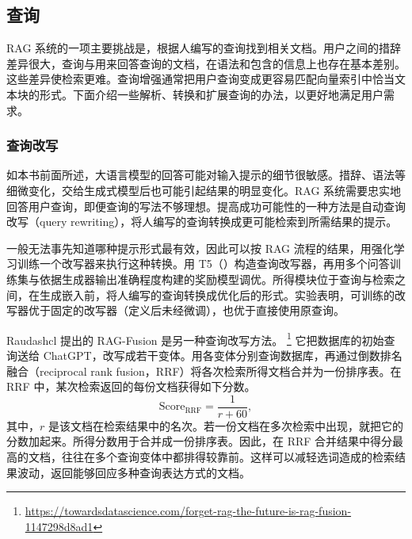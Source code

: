\subsection{查询}
\begin{keypoint}
RAG 系统的一项主要挑战是，根据人编写的查询找到相关文档。用户之间的措辞差异很大，查询与用来回答查询的文档，在语法和包含的信息上也存在基本差别。这些差异使检索更难。查询增强通常把用户查询变成更容易匹配向量索引中恰当文本块的形式。下面介绍一些解析、转换和扩展查询的办法，以更好地满足用户需求。
\end{keypoint}

\subsubsection{查询改写}
\label{sec:ch07-rewrite}
如本书前面所述，大语言模型的回答可能对输入提示的细节很敏感。措辞、语法等细微变化，交给生成式模型后也可能引起结果的明显变化。RAG 系统需要忠实地回答用户查询，即便查询的写法不够理想。提高成功可能性的一种方法是自动查询改写（query rewriting），将人编写的查询转换成更可能检索到所需结果的提示。

一般无法事先知道哪种提示形式最有效，因此可以按 RAG 流程的结果，用强化学习训练一个改写器来执行这种转换。用 T5（）构造查询改写器，再用多个问答训练集与依据生成器输出准确程度构建的奖励模型调优。所得模块位于查询与检索之间，在生成嵌入前，将人编写的查询转换成优化后的形式。实验表明，可训练的改写器优于固定的改写器（定义后未经微调），也优于直接使用原查询。


Raudashcl 提出的 RAG-Fusion 是另一种查询改写方法。%
\footnote{\url{https://towardsdatascience.com/forget-rag-the-future-is-rag-fusion-1147298d8ad1}}
它把数据库的初始查询送给 ChatGPT，改写成若干变体。用各变体分别查询数据库，再通过倒数排名融合（reciprocal rank fusion，RRF）将各次检索所得文档合并为一份排序表。在 RRF 中，某次检索返回的每份文档获得如下分数。
\begin{equation}
\mathrm{Score}_{\mathrm{RRF}}=\frac{1}{r+60},
\label{eq:ch07-rrf}
\end{equation}
其中，$r$ 是该文档在检索结果中的名次。若一份文档在多次检索中出现，就把它的分数加起来。所得分数用于合并成一份排序表。因此，在 RRF 合并结果中得分最高的文档，往往在多个查询变体中都排得较靠前。这样可以减轻选词造成的检索结果波动，返回能够回应多种查询表达方式的文档。

